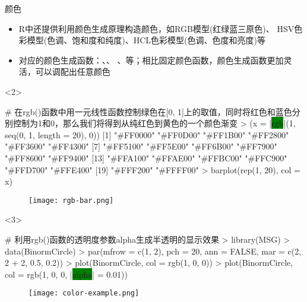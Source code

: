 \begin{frame}[t,fragile]{\subsecname}{颜色}
\begin{itemize}
\item R中还提供利用颜色生成原理构造颜色，如RGB模型(红绿蓝三原色)、
          HSV色彩模型(色调、饱和度和纯度)、HCL色彩模型(色调、色度和亮度)等
\item 对应的颜色生成函数：、、
      、等；相比固定颜色函数，颜色生成函数更加灵活，可以调配出任意颜色
\end{itemize}

\begin{overlayarea}{\textwidth}{\textheight}
\begin{onlyenv}<2>
\begin{rcode}
# 在rgb()函数中用一元线性函数控制绿色在[0, 1]上的取值，同时将红色和蓝色分别控制为1和0，那么我们将得到从纯红色到黄色的一个颜色渐变
> (x = |\colorbox{green}{rgb}|(1, seq(0, 1, length = 20), 0))
 [1] "#FF0000" "#FF0D00" "#FF1B00" "#FF2800" "#FF3600" "#FF4300" 
 [7] "#FF5100" "#FF5E00" "#FF6B00" "#FF7900" "#FF8600" "#FF9400" 
[13] "#FFA100" "#FFAE00" "#FFBC00" "#FFC900" "#FFD700" "#FFE400" 
[19] "#FFF200" "#FFFF00"
> barplot(rep(1, 20), col = x)
\end{rcode}
\begin{figure}\centering
  \texttt{[image: rgb-bar.png]}
\end{figure}
\end{onlyenv}

\begin{onlyenv}<3>
\begin{rcode}
# 利用rgb()函数的透明度参数alpha生成半透明的显示效果
> library(MSG)
> data(BinormCircle)
> par(mfrow = c(1, 2), pch = 20, ann = FALSE, mar = c(2, 2 + 2, 0.5, 0.2))
> plot(BinormCircle, col = rgb(1, 0, 0))
> plot(BinormCircle, col = rgb(1, 0, 0, |\colorbox{green}{alpha}| = 0.01))
\end{rcode}
\begin{figure}\centering
  \texttt{[image: color-example.png]}
\end{figure}
\end{onlyenv}
\end{overlayarea}  
\end{frame}

